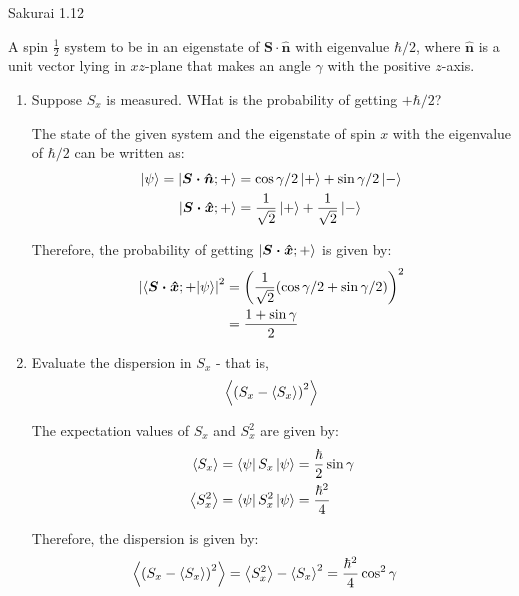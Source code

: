 \documentclass{article}
\begin{document}
\newpage
\begin{section}{Sakurai 1.12}
	\newcommand{\nbold}{\boldsymbol{\hat{n}}}
	\newcommand{\sdotn}{\boldsymbol{S \cdot \hat{n}}}
	\newcommand{\sdotnplus}{\ket{\sdotn; +}}
	\newcommand{\sdotnminus}{\ket{\sdotn; -}}

	A spin $\frac{1}{2}$ system to be in an eigenstate of $\sdotn$ with eigenvalue $\hbar/2$, where $\nbold$ is a unit vector lying in $xz$-plane that makes an angle $\gamma$ with the positive $z$-axis.

	\begin{enumerate}
		\item Suppose $S_x$ is measured. WHat is the probability of getting $+\hbar/2$?

			\begin{tcolorbox}[breakable]
				The state of the given system and the eigenstate of spin $x$ with the eigenvalue of $\hbar/2$ can be written as:
				\begin{align*}
					\ket{\psi} = \ket{\boldsymbol{S \cdot \hat{n}}; +} & = \cos{\gamma / 2} \ket{+} + \sin{\gamma / 2} \ket{-}     \\
					\ket{\boldsymbol{S \cdot \hat{x}}; +}              & = \frac{1}{\sqrt{2}} \ket{+} + \frac{1}{\sqrt{2}} \ket{-}
				\end{align*}

				Therefore, the probability of getting $\ket{\boldsymbol{S \cdot \hat{x}}; +}$ is given by:
				\begin{align*}
					\left|\bra{\boldsymbol{S \cdot \hat{x}}; +} \ket{\psi}\right|^2
					 & = \left(\frac{1}{\sqrt{2}} (\cos{\gamma / 2} + \sin{\gamma / 2})\right)^2 \\
					 & = \frac{1+ \sin{\gamma}}{2}
				\end{align*}
			\end{tcolorbox}

		\item Evaluate the dispersion in $S_x$ - that is,
			\newcommand{\expc}[1]{\left<#1\right>}
			\begin{equation*}
				\expc{\pbracket{S_x - \expc{S_x}}^2}
			\end{equation*}

			\begin{tcolorbox}
				The expectation values of $S_x$ and $S_x^2$ are given by:
				\begin{align*}
					\expc{S_x}   & = \bra{\psi}{S_x}\ket{\psi} = \frac{\hbar}{2} \sin{\gamma} \\
					\expc{S_x^2} & = \bra{\psi}{S_x^2}\ket{\psi} = \frac{\hbar^2}{4}
				\end{align*}

				Therefore, the dispersion is given by:
				\begin{align*}
					\expc{\pbracket{S_x - \expc{S_x}}^2} = \expc{S_x^2} - \expc{S_x}^2 & = \frac{\hbar^2}{4} \cos^2{\gamma}
				\end{align*}
			\end{tcolorbox}
	\end{enumerate}
\end{section}
\end{document}
